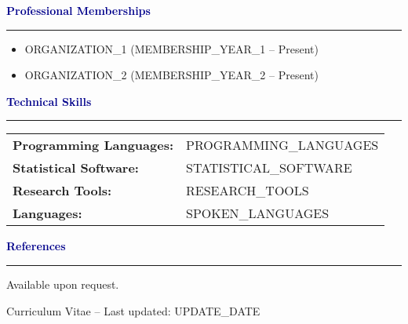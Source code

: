 \documentclass[11pt,letterpaper]{article}
\newcommand{\cvsection}[1]{\textcolor{darkblue}{\textbf{\large #1}}\hrule\vspace{0.1in}}
\begin{document}
\cvsection{Professional Memberships}

\begin{itemize}[leftmargin=0.2in]
    \item {ORGANIZATION\_1} ({MEMBERSHIP\_YEAR\_1} -- Present)
    \item {ORGANIZATION\_2} ({MEMBERSHIP\_YEAR\_2} -- Present)
\end{itemize}
\vspace{0.15in}

\cvsection{Technical Skills}

\begin{tabular}{@{}ll@{}}
\textbf{Programming Languages:} & {PROGRAMMING\_LANGUAGES} \\
\textbf{Statistical Software:} & {STATISTICAL\_SOFTWARE} \\
\textbf{Research Tools:} & {RESEARCH\_TOOLS} \\
\textbf{Languages:} & {SPOKEN\_LANGUAGES}
\end{tabular}
\vspace{0.15in}

\cvsection{References}

Available upon request.

\vspace{0.2in}
\centerline{\footnotesize Curriculum Vitae -- Last updated: {UPDATE\_DATE}}
\end{document}
